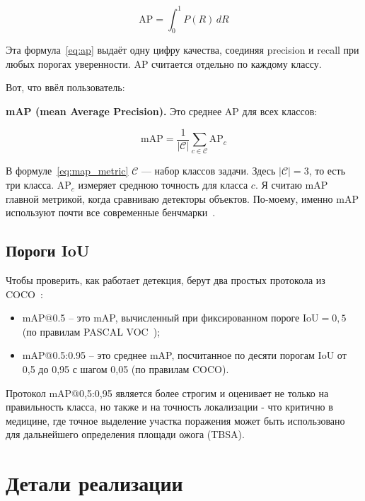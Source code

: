\begin{equation}
\text{AP} = \int_0^1 P(R)\,dR
\label{eq:ap}
\end{equation}

Эта формула~\eqref{eq:ap} выдаёт одну цифру качества, соединяя precision и recall при любых порогах уверенности. AP считается отдельно по каждому классу.

Вот, что ввёл пользователь:

\textbf{mAP (mean Average Precision).} Это среднее AP для всех классов:

\begin{equation}
\text{mAP} = \frac{1}{|\mathcal{C}|} \sum_{c \in \mathcal{C}} \text{AP}_c
\label{eq:map_metric}
\end{equation}

В формуле~\eqref{eq:map_metric} \(\mathcal{C}\) — набор классов задачи. Здесь \(|\mathcal{C}|=3\), то есть три класса. \(\text{AP}_c\) измеряет среднюю точность для класса \(c\). Я считаю mAP главной метрикой, когда сравниваю детекторы объектов. По‑моему, именно mAP используют почти все современные бенчмарки~\cite{lin2014coco,everingham2010pascal}.

\subsection{Пороги IoU}

Чтобы проверить, как работает детекция, берут два простых протокола из COCO~\cite{lin2014coco}:

\begin{itemize}
\item mAP@0.5 -- это mAP, вычисленный при фиксированном пороге $\text{IoU}=0{,}5$ (по правилам PASCAL VOC~\cite{everingham2010pascal});
\item mAP@0.5:0.95 -- это среднее mAP, посчитанное по десяти порогам IoU от 0{,}5 до 0{,}95 с шагом 0{,}05 (по правилам COCO).
\end{itemize}

Протокол mAP@0{,}5:0{,}95 является более строгим и оценивает не только на правильность класса, но также и на точность локализации - что критично в медицине, где точное выделение участка поражения может быть использовано для дальнейшего определения площади ожога (TBSA).

\section{Детали реализации}

